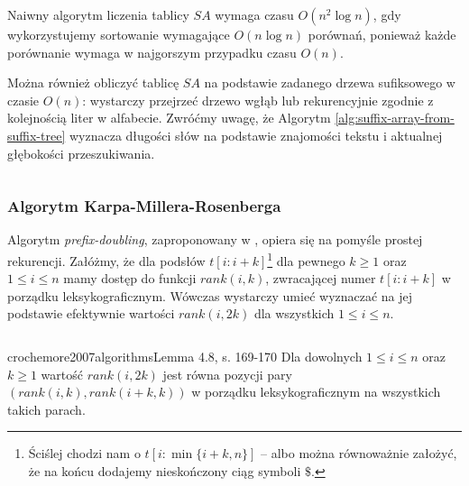 Naiwny algorytm liczenia tablicy $SA$ wymaga czasu $O(n^2 \log{n})$, gdy wykorzystujemy sortowanie wymagające $O(n \log{n})$ porównań, ponieważ każde porównanie wymaga w najgorszym przypadku czasu $O(n)$.

Można również obliczyć tablicę $SA$ na podstawie zadanego drzewa sufiksowego w czasie $O(n)$: wystarczy przejrzeć drzewo wgłąb lub rekurencyjnie zgodnie z kolejnością liter w alfabecie. Zwróćmy uwagę, że Algorytm \ref{alg:suffix-array-from-suffix-tree} wyznacza długości słów na podstawie znajomości tekstu i aktualnej głębokości przeszukiwania.

\begin{code}
\inputminted{python}{code/suffix-array/from-suffix-tree.py}
\label{alg:suffix-array-from-suffix-tree}
\end{code}

\subsubsection{Algorytm Karpa-Millera-Rosenberga}

Algorytm \emph{prefix-doubling}, zaproponowany w \citep{karp1972rapid}, opiera się na pomyśle prostej rekurencji. Załóżmy, że dla podsłów $t[i:i + k]$\footnote{Ściślej chodzi nam o $t[i:\min \{i + k, n\}]$ -- albo można równoważnie założyć, że na końcu dodajemy nieskończony ciąg symboli $\$$.} dla pewnego $k \ge 1$ oraz $1 \le i \le n$ mamy dostęp do funkcji $rank(i, k)$, zwracającej numer $t[i:i + k]$ w porządku leksykograficznym.
Wówczas wystarczy umieć wyznaczać na jej podstawie efektywnie wartości $rank(i, 2k)$ dla wszystkich $1 \le i \le n$.

\begin{code}
\inputminted{python}{code/suffix-array/kmr.py}
\label{alg:suffix-array-kmr}
\end{code}

\begin{lemma}{crochemore2007algorithms}{Lemma 4.8, s. 169-170}
  Dla dowolnych $1 \le i \le n$ oraz $k \ge 1$ wartość $rank(i, 2k)$ jest równa pozycji pary $(rank(i, k), rank(i + k, k))$ w porządku leksykograficznym na wszystkich takich parach.
\end{lemma}

